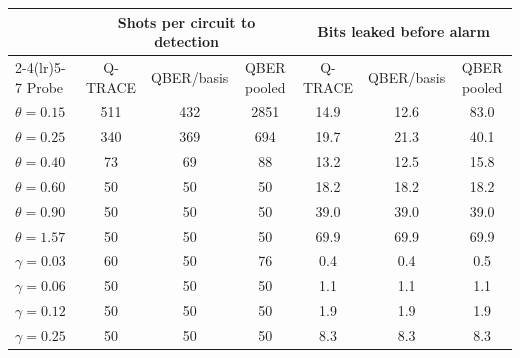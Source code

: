 \begin{tabular}{lcccccc}
\toprule
 & \multicolumn{3}{c}{Shots per circuit to detection} & \multicolumn{3}{c}{Bits leaked before alarm} \\
\cmidrule(lr){2-4}\cmidrule(lr){5-7}
Probe & Q-TRACE & QBER/basis & QBER pooled & Q-TRACE & QBER/basis & QBER pooled \\
\midrule
$\theta=0.15$ & 511 & 432 & 2851 & 14.9 & 12.6 & 83.0 \\
$\theta=0.25$ & 340 & 369 & 694 & 19.7 & 21.3 & 40.1 \\
$\theta=0.40$ & 73 & 69 & 88 & 13.2 & 12.5 & 15.8 \\
$\theta=0.60$ & 50 & 50 & 50 & 18.2 & 18.2 & 18.2 \\
$\theta=0.90$ & 50 & 50 & 50 & 39.0 & 39.0 & 39.0 \\
$\theta=1.57$ & 50 & 50 & 50 & 69.9 & 69.9 & 69.9 \\
\midrule
$\gamma=0.03$ & 60 & 50 & 76 & 0.4 & 0.4 & 0.5 \\
$\gamma=0.06$ & 50 & 50 & 50 & 1.1 & 1.1 & 1.1 \\
$\gamma=0.12$ & 50 & 50 & 50 & 1.9 & 1.9 & 1.9 \\
$\gamma=0.25$ & 50 & 50 & 50 & 8.3 & 8.3 & 8.3 \\
\bottomrule
\end{tabular}
